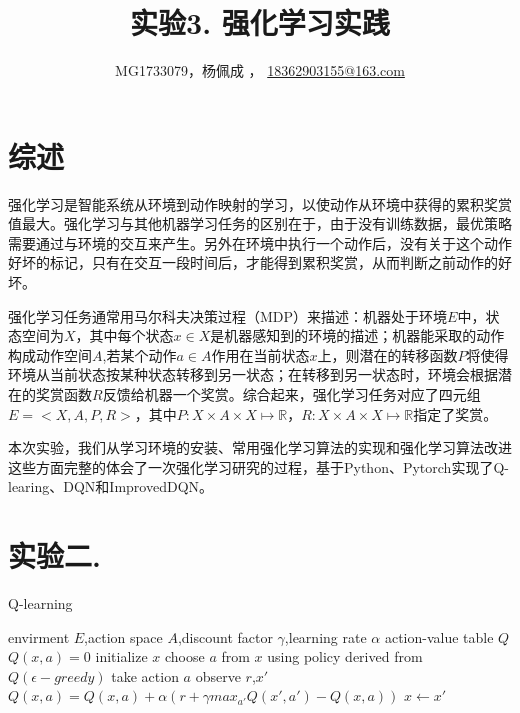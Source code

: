 \documentclass[a4paper,UTF8]{article}
\theoremstyle{definition}
\renewcommand{\algorithmicrequire}{\textbf{Input:}}
\renewcommand{\algorithmicensure}{\textbf{Procedure:}}
\begin{document}
\title{实验3. 强化学习实践}
\author{MG1733079，杨佩成 ， \url{18362903155@163.com}}
\maketitle

\section*{综述}
	强化学习是智能系统从环境到动作映射的学习，以使动作从环境中获得的累积奖赏值最大。强化学习与其他机器学习任务的区别在于，由于没有训练数据，最优策略需要通过与环境的交互来产生。另外在环境中执行一个动作后，没有关于这个动作好坏的标记，只有在交互一段时间后，才能得到累积奖赏，从而判断之前动作的好坏。

	强化学习任务通常用马尔科夫决策过程（MDP）来描述：机器处于环境$E$中，状态空间为$X$，其中每个状态$x \in X$是机器感知到的环境的描述；机器能采取的动作构成动作空间$A$,若某个动作$a \in A$作用在当前状态$x$上，则潜在的转移函数$P$将使得环境从当前状态按某种状态转移到另一状态；在转移到另一状态时，环境会根据潜在的奖赏函数$R$反馈给机器一个奖赏。综合起来，强化学习任务对应了四元组$E=<X,A,P,R>$，其中$P:X \times A \times X \mapsto \mathbb{R}$，$R:X \times A \times X \mapsto \mathbb{R}$指定了奖赏\cite{ref1}。

	本次实验，我们从学习环境的安装、常用强化学习算法的实现和强化学习算法改进这些方面完整的体会了一次强化学习研究的过程，基于Python、Pytorch实现了Q-learing、DQN和ImprovedDQN。

\section*{实验二. }
	\begin{algorithm}
	\renewcommand{\algorithmicrequire}{\textbf{Input:}}
	\renewcommand{\algorithmicensure}{\textbf{Output:}}
	\caption{Q-learning}
	\label{alg:1}
	\begin{algorithmic}[1]
		\REQUIRE envirment $E$,action space $A$,discount factor $\gamma$,learning rate $\alpha$
		\ENSURE action-value table $Q$
		\STATE $Q(x,a)=0$
			\STATE initialize $x$
			\REPEAT
			\STATE choose $a$ from $x$ using policy derived from $Q(\epsilon-greedy)$
			\STATE take action $a$ \quad observe $r$,$x'$
			\STATE $Q(x,a)=Q(x,a)+\alpha(r+\gamma max_{a'}Q(x',a')-Q(x,a))$
			\STATE $x\gets x'$
		\ENDFOR
\end{algorithmic}  
\end{algorithm}
	
\end{document}
